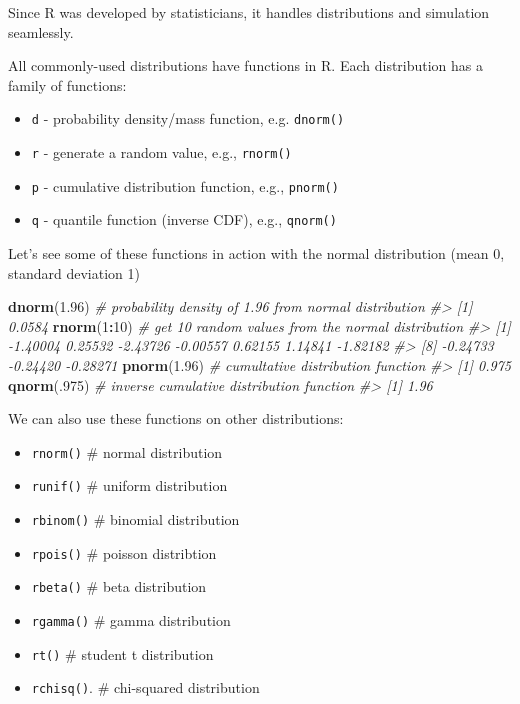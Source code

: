 \documentclass[]{book}
\newenvironment{Shaded}{\begin{snugshade}}{\end{snugshade}}
\newcommand{\CommentTok}[1]{\textcolor[rgb]{0.56,0.35,0.01}{\textit{#1}}}
\newcommand{\DecValTok}[1]{\textcolor[rgb]{0.00,0.00,0.81}{#1}}
\newcommand{\FloatTok}[1]{\textcolor[rgb]{0.00,0.00,0.81}{#1}}
\newcommand{\KeywordTok}[1]{\textcolor[rgb]{0.13,0.29,0.53}{\textbf{#1}}}
\newcommand{\NormalTok}[1]{#1}
\newcommand{\OperatorTok}[1]{\textcolor[rgb]{0.81,0.36,0.00}{\textbf{#1}}}
\providecommand{\tightlist}{%
  \setlength{\itemsep}{0pt}\setlength{\parskip}{0pt}}
\begin{document}
Since R was developed by statisticians, it handles distributions and simulation seamlessly.

All commonly-used distributions have functions in R. Each distribution has a family of functions:

\begin{itemize}
\tightlist
\item
  \texttt{d} - probability density/mass function, e.g. \texttt{dnorm()}
\item
  \texttt{r} - generate a random value, e.g., \texttt{rnorm()}
\item
  \texttt{p} - cumulative distribution function, e.g., \texttt{pnorm()}
\item
  \texttt{q} - quantile function (inverse CDF), e.g., \texttt{qnorm()}
\end{itemize}

Let's see some of these functions in action with the normal distribution (mean 0, standard deviation 1)

\begin{Shaded}
\begin{Highlighting}[]
\KeywordTok{dnorm}\NormalTok{(}\FloatTok{1.96}\NormalTok{) }\CommentTok{# probability density of 1.96 from normal distribution}
\CommentTok{#> [1] 0.0584}
\KeywordTok{rnorm}\NormalTok{(}\DecValTok{1}\OperatorTok{:}\DecValTok{10}\NormalTok{) }\CommentTok{# get 10 random values from the normal distribution}
\CommentTok{#>  [1] -1.40004  0.25532 -2.43726 -0.00557  0.62155  1.14841 -1.82182}
\CommentTok{#>  [8] -0.24733 -0.24420 -0.28271}
\KeywordTok{pnorm}\NormalTok{(}\FloatTok{1.96}\NormalTok{) }\CommentTok{# cumultative distribution function}
\CommentTok{#> [1] 0.975}
\KeywordTok{qnorm}\NormalTok{(.}\DecValTok{975}\NormalTok{) }\CommentTok{# inverse cumulative distribution function}
\CommentTok{#> [1] 1.96}
\end{Highlighting}
\end{Shaded}

We can also use these functions on other distributions:

\begin{itemize}
\tightlist
\item
  \texttt{rnorm()} \# normal distribution
\item
  \texttt{runif()} \# uniform distribution
\item
  \texttt{rbinom()} \# binomial distribution
\item
  \texttt{rpois()} \# poisson distribtion
\item
  \texttt{rbeta()} \# beta distribution
\item
  \texttt{rgamma()} \# gamma distribution
\item
  \texttt{rt()} \# student t distribution
\item
  \texttt{rchisq()}. \# chi-squared distribution
\end{itemize}
\end{document}
